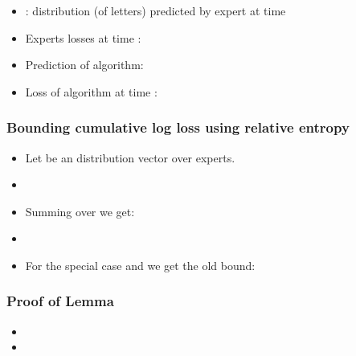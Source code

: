 \documentclass{beamer}
\begin{document}
\begin{small}
\begin{frame}
\begin{itemize}
\item {}: distribution (of letters) predicted by expert  at time  
\item Experts losses at time :
\item Prediction of algorithm: 
\item Loss of algorithm at time :  
\end{itemize}
\end{frame}

\begin{frame}
\frametitle{Bounding cumulative log loss using relative entropy}

\begin{itemize}
\item Let \R{$\vu$} be an  distribution vector over experts.
\item {}
\item Summing over  we get:
\item
{}
\item For the special case  and  we get
  the old bound:
\end{itemize}
\end{frame}


\begin{frame}
\frametitle{Proof of Lemma}
\begin{itemize}
\item {}
\item
{}
\end{itemize}
\end{frame}
\fi


\end{small}
\end{document}
